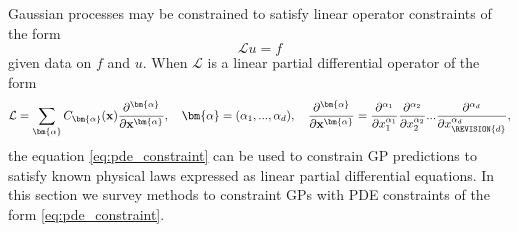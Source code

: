 \label{sec:pde_constraints}
Gaussian processes may be constrained to satisfy linear operator constraints of the form
\renewcommand\vec{\mathbf}
\begin{equation}
\label{eq:pde_constraint}
\mathcal{L} u = f
\end{equation}
given data on $f$ and $u$. 
When $\mathcal{L}$ is a linear partial differential operator of the form
\begin{equation}
\label{eq:lin_diff_op}
\mathcal{L} = \sum_{\bm{\alpha}} C_{\bm{\alpha}}(\mathbf{x}) \frac{\partial^{\bm{\alpha}}}{\partial \mathbf{x}^{\bm{\alpha}}}, \quad
\bm{\alpha} = (\alpha_1, ..., \alpha_d), \quad
\frac{\partial^{\bm{\alpha}}}{\partial \mathbf{x}^{\bm{\alpha}}} = 
\frac{\partial^{{\alpha}_1}}{\partial {x}_1^{{\alpha}_1}}
\frac{\partial^{{\alpha}_2}}{\partial {x}_2^{{\alpha}_2}}
...
\frac{\partial^{{\alpha}_d}}{\partial {x}_{\REVISION{d}}^{{\alpha}_d}},
\end{equation}
the equation \eqref{eq:pde_constraint} can be used to 
constrain GP predictions to satisfy known physical laws expressed as linear partial differential equations.
In this section we survey methods to constraint GPs with PDE constraints of the form \eqref{eq:pde_constraint}.

